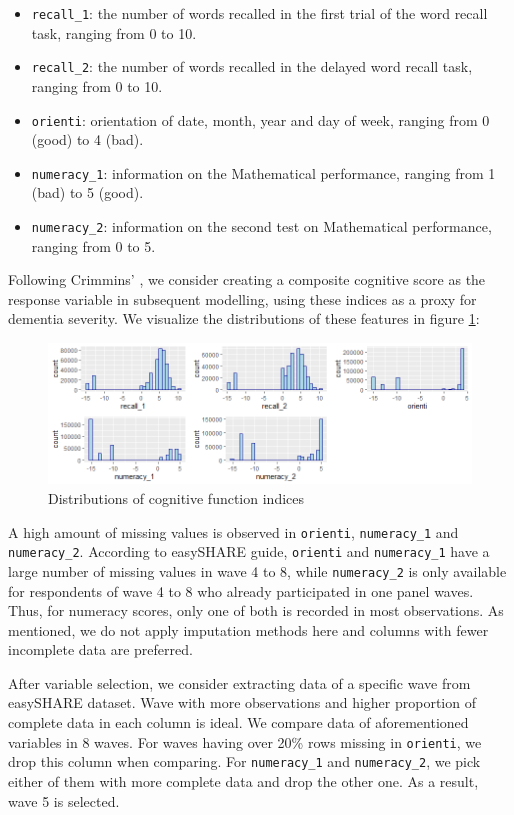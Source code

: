 \documentclass[11pt,twoside]{article}
\numberwithin{Theorem}{section}
\numberwithin{Definition}{section}
\numberwithin{Lemma}{section}
\numberwithin{Algorithm}{section}
\numberwithin{equation}{section}
\begin{document}
\begin{itemize}
	\item \texttt{recall\_1}: the number of words recalled in the first trial of the word recall task, ranging from 0 to 10.
	\item \texttt{recall\_2}: the number of words recalled in the delayed word recall task, ranging from 0 to 10.
	\item \texttt{orienti}: orientation of date, month, year and day of week, ranging from 0 (good) to 4 (bad).
	\item \texttt{numeracy\_1}: information on the Mathematical performance, ranging from 1 (bad) to 5 (good).
	\item \texttt{numeracy\_2}: information on the second test on Mathematical performance, ranging from 0 to 5.
\end{itemize}

Following Crimmins' \cite{crimmins2011assessment}, we consider creating a composite cognitive score as the response variable in subsequent modelling, using these indices as a proxy for dementia severity. We visualize the distributions of these features in figure \ref{fig:cog_dist}:

\begin{figure}[!h]
	\centering
	\includegraphics[width = 0.8 \textwidth]{Images/cog_dist.png}
	\caption{Distributions of cognitive function indices}
	\label{fig:cog_dist}
\end{figure}

A high amount of missing values is observed in \texttt{orienti}, \texttt{numeracy\_1} and \texttt{numeracy\_2}. According to easySHARE guide, \texttt{orienti} and \texttt{numeracy\_1} have a large number of missing values in wave 4 to 8, while \texttt{numeracy\_2} is only available for respondents of wave 4 to 8 who already participated in one panel waves. Thus, for numeracy scores, only one of both is recorded in most observations. As mentioned, we do not apply imputation methods here and columns with fewer incomplete data are preferred. 

After variable selection, we consider extracting data of a specific wave from easySHARE dataset. Wave with more observations and higher proportion of complete data in each column is ideal. We compare data of aforementioned variables in 8 waves. For waves having over 20\% rows missing in \texttt{orienti}, we drop this column when comparing. For \texttt{numeracy\_1} and \texttt{numeracy\_2}, we pick either of them with more complete data and drop the other one. As a result, wave 5 is selected.
\end{document}

